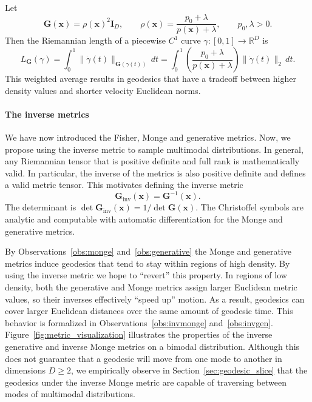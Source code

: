 \begin{observation} \label{obs:generative}
Let
\begin{equation*}
\mathbf G(\boldsymbol x)=\rho(\boldsymbol x)^2 \mathbf I_D,
\qquad
\rho(\boldsymbol x)=\frac{p_0+\lambda}{p(\boldsymbol x)+\lambda},
\qquad p_0,\lambda>0.    
\end{equation*}
Then the Riemannian length of a piecewise \(C^1\) curve \(\gamma:[0,1]\to\mathbb R^D\) is
\begin{equation*}
L_{\mathbf G}(\gamma)=
\int_0^1
\|\dot \gamma(t)\|_{\mathbf G(\gamma(t))} \,
d t
=
\int_0^1 \left(\frac{p_0+\lambda}{p(\boldsymbol x)+\lambda}\right) \|\dot\gamma(t)\|_2\,dt.    
\end{equation*}
This weighted average results in geodesics that have a tradeoff between higher density values and shorter velocity Euclidean norms.
\end{observation}


\paragraph{The inverse metrics}
We have now introduced the Fisher, Monge and generative metrics. Now, we propose using the inverse metric to sample multimodal distributions. In general, any Riemannian tensor that is positive definite and full rank is mathematically valid. In particular, the inverse of the metrics is also positive definite and defines a valid metric tensor. This motivates defining the inverse metric
\begin{equation}
\boxed{
    \mathbf{G}_{\mathrm{inv}}(\boldsymbol{x}) = \mathbf{G}^{-1}(\boldsymbol{x}).
}
\end{equation}
The determinant is $\det \mathbf{G}_{\mathrm{inv}}(\boldsymbol{x})  = 1/\det \mathbf{G}(\boldsymbol{x})$. The Christoffel symbols are analytic and computable with automatic differentiation for the Monge and generative metrics. 

By Observations~\ref{obs:monge} and~\ref{obs:generative} the Monge and generative metrics induce geodesics that tend to stay within regions of high density. By using the inverse metric we hope to ``revert'' this property. In regions of low density, both the generative and Monge metrics assign larger Euclidean metric values, so their inverses effectively ``speed up'' motion.
As a result, geodesics can cover larger Euclidean distances over the same amount of geodesic time. This behavior is formalized in Observations~{\ref{obs:invmonge}} and~{\ref{obs:invgen}}. Figure~\ref{fig:metric_visualization} illustrates the properties of the inverse generative and inverse Monge metrics on a bimodal distribution. Although this does not guarantee that a geodesic will move from one mode to another in dimensions $D\geq 2$, we empirically observe in Section~\ref{sec:geodesic_slice} that the geodesics under the inverse Monge metric are capable of traversing between modes of multimodal distributions. 

